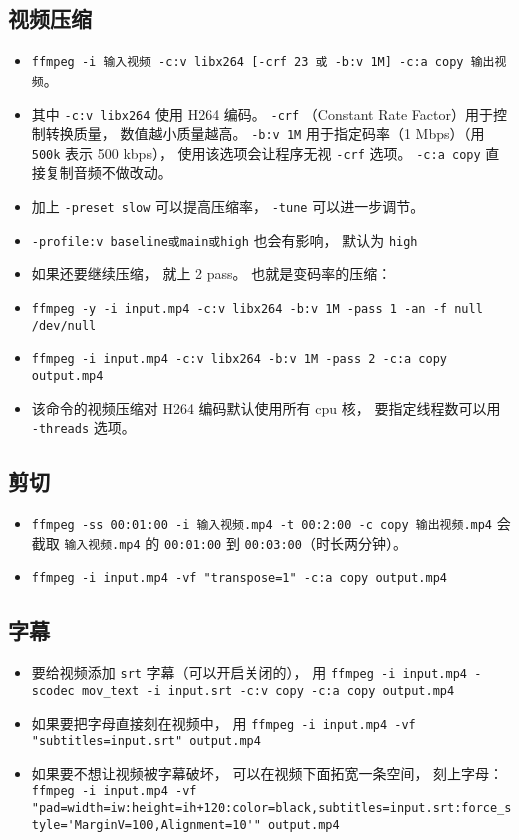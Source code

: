 \subsection{视频压缩}
\begin{itemize}
\item \verb`ffmpeg -i 输入视频 -c:v libx264 [-crf 23 或 -b:v 1M] -c:a copy 输出视频`。
\item 其中 \verb`-c:v libx264` 使用 H264 编码。 \verb`-crf` （Constant Rate Factor）用于控制转换质量， 数值越小质量越高。 \verb`-b:v 1M` 用于指定码率（1 Mbps）（用 \verb`500k` 表示 500 kbps）， 使用该选项会让程序无视 \verb`-crf` 选项。 \verb`-c:a copy` 直接复制音频不做改动。
\item 加上 \verb`-preset slow` 可以提高压缩率， \verb`-tune` 可以进一步调节。
\item \verb`-profile:v baseline或main或high` 也会有影响， 默认为 \verb`high`
\item 如果还要继续压缩， 就上 2 pass。 也就是变码率的压缩：
\item \verb`ffmpeg -y -i input.mp4 -c:v libx264 -b:v 1M -pass 1 -an -f null /dev/null`
\item \verb`ffmpeg -i input.mp4 -c:v libx264 -b:v 1M -pass 2 -c:a copy output.mp4`
\item 该命令的视频压缩对 H264 编码默认使用所有 cpu 核， 要指定线程数可以用 \verb`-threads` 选项。
\end{itemize}

\subsection{剪切}
\begin{itemize}
\item \verb`ffmpeg -ss 00:01:00 -i 输入视频.mp4 -t 00:2:00 -c copy 输出视频.mp4` 会截取 \verb`输入视频.mp4` 的 \verb`00:01:00` 到 \verb`00:03:00`（时长两分钟）。
\item \verb`ffmpeg -i input.mp4 -vf "transpose=1" -c:a copy output.mp4`
\end{itemize}

\subsection{字幕}
\begin{itemize}
\item 要给视频添加 \verb`srt` 字幕（可以开启关闭的）， 用 \verb`ffmpeg -i input.mp4 -scodec mov_text -i input.srt -c:v copy -c:a copy output.mp4`
\item 如果要把字母直接刻在视频中， 用 \verb`ffmpeg -i input.mp4 -vf "subtitles=input.srt" output.mp4`
\item 如果要不想让视频被字幕破坏， 可以在视频下面拓宽一条空间， 刻上字母： \verb`ffmpeg -i input.mp4 -vf "pad=width=iw:height=ih+120:color=black,subtitles=input.srt:force_style='MarginV=100,Alignment=10'" output.mp4`
\end{itemize}
